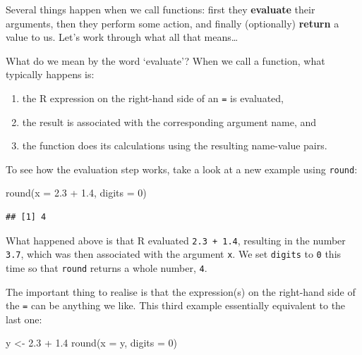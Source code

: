 \documentclass[
]{book}
\newenvironment{Shaded}{\begin{snugshade}}{\end{snugshade}}
\newcommand{\AttributeTok}[1]{\textcolor[rgb]{0.77,0.63,0.00}{#1}}
\newcommand{\DecValTok}[1]{\textcolor[rgb]{0.00,0.00,0.81}{#1}}
\newcommand{\FloatTok}[1]{\textcolor[rgb]{0.00,0.00,0.81}{#1}}
\newcommand{\FunctionTok}[1]{\textcolor[rgb]{0.00,0.00,0.00}{#1}}
\newcommand{\NormalTok}[1]{#1}
\newcommand{\OtherTok}[1]{\textcolor[rgb]{0.56,0.35,0.01}{#1}}
\newcommand{\SpecialCharTok}[1]{\textcolor[rgb]{0.00,0.00,0.00}{#1}}
\providecommand{\tightlist}{%
  \setlength{\itemsep}{0pt}\setlength{\parskip}{0pt}}
\begin{document}
Several things happen when we call functions: first they \textbf{evaluate} their arguments, then they perform some action, and finally (optionally) \textbf{return} a value to us. Let's work through what all that means\ldots{}

What do we mean by the word `evaluate'? When we call a function, what typically happens is:

\begin{enumerate}
\def\labelenumi{\arabic{enumi}.}
\tightlist
\item
  the R expression on the right-hand side of an \texttt{=} is evaluated,
\item
  the result is associated with the corresponding argument name, and
\item
  the function does its calculations using the resulting name-value pairs.
\end{enumerate}

To see how the evaluation step works, take a look at a new example using \texttt{round}:

\begin{Shaded}
\begin{Highlighting}[]
\FunctionTok{round}\NormalTok{(}\AttributeTok{x =} \FloatTok{2.3} \SpecialCharTok{+} \FloatTok{1.4}\NormalTok{, }\AttributeTok{digits =} \DecValTok{0}\NormalTok{)}
\end{Highlighting}
\end{Shaded}

\begin{verbatim}
## [1] 4
\end{verbatim}

What happened above is that R evaluated \texttt{2.3\ +\ 1.4}, resulting in the number \texttt{3.7}, which was then associated with the argument \texttt{x}. We set \texttt{digits} to \texttt{0} this time so that \texttt{round} returns a whole number, \texttt{4}.

The important thing to realise is that the expression(s) on the right-hand side of the \texttt{=} can be anything we like. This third example essentially equivalent to the last one:

\begin{Shaded}
\begin{Highlighting}[]
\NormalTok{y }\OtherTok{\textless{}{-}} \FloatTok{2.3} \SpecialCharTok{+} \FloatTok{1.4}
\FunctionTok{round}\NormalTok{(}\AttributeTok{x =}\NormalTok{ y, }\AttributeTok{digits =} \DecValTok{0}\NormalTok{)}
\end{Highlighting}
\end{Shaded}
\end{document}
